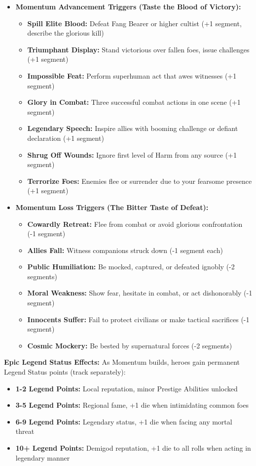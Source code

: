 \documentclass[11pt]{article}
\begin{document}
\begin{itemize}
\item \textbf{Momentum Advancement Triggers (Taste the Blood of Victory):}
  \begin{itemize}
  \item \textbf{Spill Elite Blood:} Defeat Fang Bearer or higher cultist (+1 segment, describe the glorious kill)
  \item \textbf{Triumphant Display:} Stand victorious over fallen foes, issue challenges (+1 segment)
  \item \textbf{Impossible Feat:} Perform superhuman act that awes witnesses (+1 segment)
  \item \textbf{Glory in Combat:} Three successful combat actions in one scene (+1 segment)
  \item \textbf{Legendary Speech:} Inspire allies with booming challenge or defiant declaration (+1 segment)
  \item \textbf{Shrug Off Wounds:} Ignore first level of Harm from any source (+1 segment)
  \item \textbf{Terrorize Foes:} Enemies flee or surrender due to your fearsome presence (+1 segment)
  \end{itemize}
\item \textbf{Momentum Loss Triggers (The Bitter Taste of Defeat):}
  \begin{itemize}
  \item \textbf{Cowardly Retreat:} Flee from combat or avoid glorious confrontation (-1 segment)
  \item \textbf{Allies Fall:} Witness companions struck down (-1 segment each)
  \item \textbf{Public Humiliation:} Be mocked, captured, or defeated ignobly (-2 segments)
  \item \textbf{Moral Weakness:} Show fear, hesitate in combat, or act dishonorably (-1 segment)
  \item \textbf{Innocents Suffer:} Fail to protect civilians or make tactical sacrifices (-1 segment)
  \item \textbf{Cosmic Mockery:} Be bested by supernatural forces (-2 segments)
  \end{itemize}
\end{itemize}

\textbf{Epic Legend Status Effects:}
As Momentum builds, heroes gain permanent Legend Status points (track separately):
\begin{itemize}
\item \textbf{1-2 Legend Points:} Local reputation, minor Prestige Abilities unlocked
\item \textbf{3-5 Legend Points:} Regional fame, +1 die when intimidating common foes
\item \textbf{6-9 Legend Points:} Legendary status, +1 die when facing any mortal threat
\item \textbf{10+ Legend Points:} Demigod reputation, +1 die to all rolls when acting in legendary manner
\end{itemize}
\end{document}
